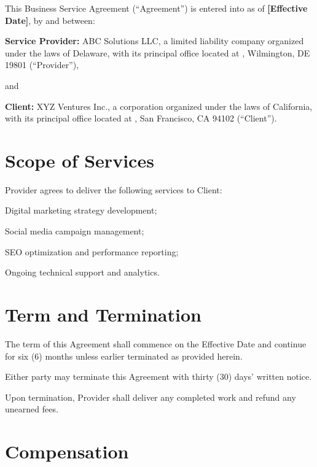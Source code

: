 
This Business Service Agreement (``Agreement'') is entered into as of \textbf{[Effective Date]}, by and between:

\textbf{Service Provider:} ABC Solutions LLC, a limited liability company organized under the laws of Delaware, with its principal office located at , Wilmington, DE 19801 (``Provider''),

and

\textbf{Client:} XYZ Ventures Inc., a corporation organized under the laws of California, with its principal office located at , San Francisco, CA 94102 (``Client'').

\section{Scope of Services}

Provider agrees to deliver the following services to Client:
\begin{compactenum}
	\item Digital marketing strategy development;
	\item Social media campaign management;
	\item SEO optimization and performance reporting;
	\item Ongoing technical support and analytics.
\end{compactenum}

\section{Term and Termination}

\begin{compactenum}
	\item The term of this Agreement shall commence on the Effective Date and continue for six (6) months unless earlier terminated as provided herein.
	\item Either party may terminate this Agreement with thirty (30) days' written notice.
	\item Upon termination, Provider shall deliver any completed work and refund any unearned fees.
\end{compactenum}

\section{Compensation}

